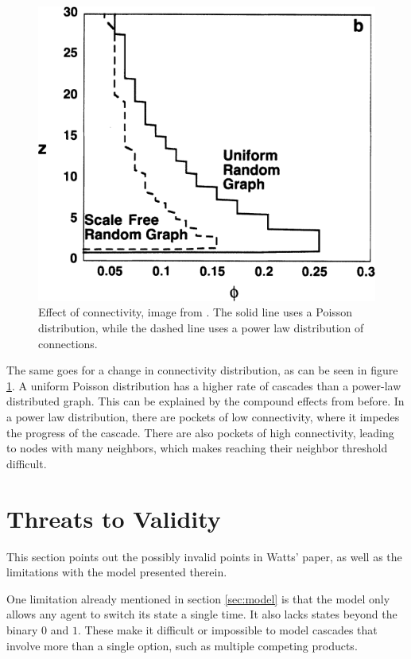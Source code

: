 \documentclass{sig-alternate-05-2015}
\begin{document}
\begin{figure}[h!]
  \centering
  \includegraphics[width=\columnwidth]{img/dunnolol}
  \caption{Effect of connectivity, image from \cite{simplemodel}. The solid line uses a Poisson distribution, while the dashed line uses a power law distribution of connections.}
  \label{fig:dunnolol}
\end{figure}

The same goes for a change in connectivity distribution, as can be seen in figure \ref{fig:dunnolol}. A uniform Poisson distribution has a higher rate of cascades than a power-law distributed graph. This can be explained by the compound effects from before. In a power law distribution, there are pockets of low connectivity, where it impedes the progress of the cascade. There are also pockets of high connectivity, leading to nodes with many neighbors, which makes reaching their neighbor threshold difficult.


\section{Threats to Validity}\label{sec:threats}

This section points out the possibly invalid points in Watts' paper\cite{simplemodel}, as well as the limitations with the model presented therein.

One limitation already mentioned in section \ref{sec:model} is that the model only allows any agent to switch its state a single time. It also lacks states beyond the binary $0$ and $1$. These make it difficult or impossible to model cascades that involve more than a single option, such as multiple competing products.
\end{document}
